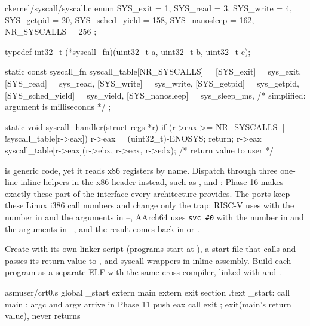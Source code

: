 \documentclass[11pt,a4paper]{article}
\begin{document}
\begin{lst}{c}{kernel/syscall/syscall.c}
enum { SYS_exit = 1, SYS_read = 3, SYS_write = 4, SYS_getpid = 20,
       SYS_sched_yield = 158, SYS_nanosleep = 162, NR_SYSCALLS = 256 };

typedef int32_t (*syscall_fn)(uint32_t a, uint32_t b, uint32_t c);

static const syscall_fn syscall_table[NR_SYSCALLS] = {
    [SYS_exit]        = sys_exit,
    [SYS_read]        = sys_read,
    [SYS_write]       = sys_write,
    [SYS_getpid]      = sys_getpid,
    [SYS_sched_yield] = sys_yield,
    [SYS_nanosleep]   = sys_sleep_ms,      /* simplified: argument is milliseconds */
};

static void syscall_handler(struct regs *r)
{
    if (r->eax >= NR_SYSCALLS || !syscall_table[r->eax]) {
        r->eax = (uint32_t)-ENOSYS;
        return;
    }
    r->eax = syscall_table[r->eax](r->ebx, r->ecx, r->edx);   /* return value to user */
}
\end{lst}

\begin{tipbox}
 is generic code, yet it reads x86 registers by name. Dispatch through three one-line inline
helpers in the x86 header instead, such as , \mbox{} and \mbox{}:
Phase 16 makes exactly these part of the interface every architecture provides. The ports keep these Linux i386 call
numbers and change only the trap: RISC-V uses  with the number in  and the arguments in
--, AArch64 uses \texttt{svc~\#0} with the number in  and the arguments in
--, and the result comes back in  or .
\end{tipbox}

Create  with its own linker script (programs start at ), a start file that calls
 and passes its return value to , and syscall wrappers in inline assembly. Build each program as a
separate ELF with the same cross compiler, linked with  and .

\begin{lst}{asm}{user/crt0.s}
global _start
extern main
extern exit
section .text
_start:
    call main               ; argc and argv arrive in Phase 11
    push eax
    call exit               ; exit(main's return value), never returns
\end{lst}
\end{document}
